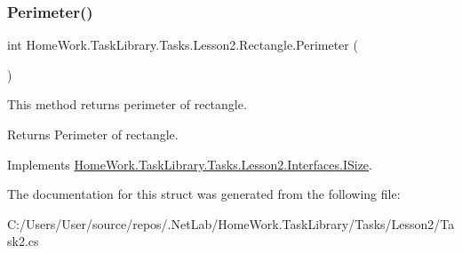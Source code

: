 \subsubsection{\texorpdfstring{Perimeter()}{Perimeter()}}
{\footnotesize\ttfamily int Home\+Work.\+Task\+Library.\+Tasks.\+Lesson2.\+Rectangle.\+Perimeter (\begin{DoxyParamCaption}{ }\end{DoxyParamCaption})}



This method returns perimeter of rectangle. 

\begin{DoxyReturn}{Returns}
Perimeter of rectangle.
\end{DoxyReturn}


Implements \mbox{\hyperlink{interface_home_work_1_1_task_library_1_1_tasks_1_1_lesson2_1_1_interfaces_1_1_i_size}{Home\+Work.\+Task\+Library.\+Tasks.\+Lesson2.\+Interfaces.\+I\+Size}}.



The documentation for this struct was generated from the following file\+:\begin{DoxyCompactItemize}
\item 
C\+:/\+Users/\+User/source/repos/.\+Net\+Lab/\+Home\+Work.\+Task\+Library/\+Tasks/\+Lesson2/Task2.\+cs\end{DoxyCompactItemize}
